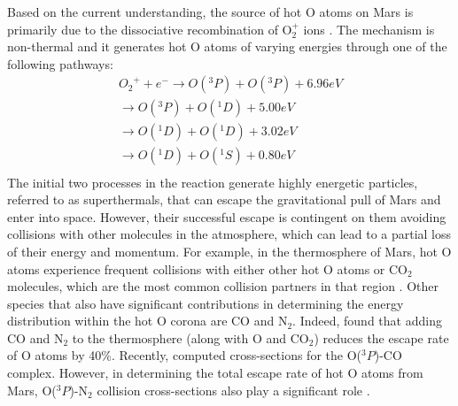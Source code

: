 \documentclass[fleqn,usenatbib]{mnras}
\begin{document}
Based on the current understanding, the source of hot O atoms on Mars is primarily due to the dissociative recombination of O$_2^+$ ions  \citep{https://doi.org/10.1029/90JA01676, https://doi.org/10.1029/2007JE002915, lammer2013outgassing, https://doi.org/10.1029/2009JE003388, YAGI2012682}. The mechanism is non-thermal and it generates hot O atoms of varying energies through one of the following pathways:
\begin{align*}
                  {O_2}^{+} + e^{-}  \rightarrow  O(^3P) +  O(^3P) + 6.96  eV \\
                                     \rightarrow  O(^3P) +  O(^1D) + 5.00  eV \\
                                     \rightarrow  O(^1D) +  O(^1D) + 3.02  eV \\
                                     \rightarrow  O(^1D) +  O(^1S) + 0.80  eV \\
\end{align*}
The initial two processes in the reaction generate highly energetic particles, referred to as superthermals, that can escape the gravitational pull of Mars and enter into space. However, their successful escape is contingent on them avoiding collisions with other molecules in the atmosphere, which can lead to a partial loss of their energy and momentum. For example, in the thermosphere of Mars, hot O atoms experience frequent collisions with either other hot O atoms or CO$_2$ molecules, which are the most common collision partners in that region \citep{https://doi.org/10.1029/2009JE003388}. Other species that also have significant contributions in determining the energy distribution within the hot O corona are CO and N$_2$. Indeed, \cite{https://doi.org/10.1002/2015JE004890} found that adding CO and N$_2$ to the thermosphere (along with O and CO$_2$) reduces the escape rate of O atoms by 40\%. Recently, \cite{chhabra2023quantum} computed cross-sections for the O($^3P$)-CO complex. However, in determining the total escape rate of hot O atoms from Mars, O($^3P$)-N$_2$ collision cross-sections also play a significant role \citep{https://doi.org/10.1002/2015JE004890}.
\end{document}
